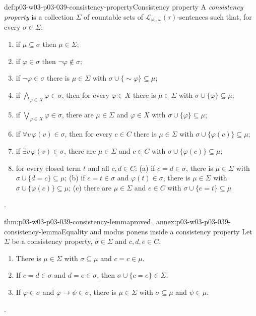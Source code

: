 \begin{hbdefinition}{def:p03-w03-p03-039-consistency-property}{Consistency property}
A \emph{consistency property} is a collection \(\Sigma\) of countable sets of
\(\mathcal L_{\omega_1,\omega}(\tau)\)-sentences such that, for every
\(\sigma\in\Sigma\):
\begin{enumerate}
\item[C0] if \(\mu\subseteq\sigma\) then \(\mu\in\Sigma\);
\item[C1] if \(\varphi\in\sigma\) then \(\neg\varphi\notin\sigma\);
\item[C2] if \(\neg\varphi\in\sigma\) there is \(\mu\in\Sigma\) with
      \(\sigma\cup\{{\sim}\varphi\}\subseteq\mu\);
\item[C3] if \(\bigwedge_{\varphi\in X}\varphi\in\sigma\), then for every
      \(\varphi\in X\) there is \(\mu\in\Sigma\) with
      \(\sigma\cup\{\varphi\}\subseteq\mu\);
\item[C4] if \(\bigvee_{\varphi\in X}\varphi\in\sigma\), there are
      \(\mu\in\Sigma\) and \(\varphi\in X\) with \(\sigma\cup\{\varphi\}\subseteq\mu\);
\item[C5] if \(\forall v\,\varphi(v)\in\sigma\), then for every \(c\in C\)
      there is \(\mu\in\Sigma\) with \(\sigma\cup\{\varphi(c)\}\subseteq\mu\);
\item[C6] if \(\exists v\,\varphi(v)\in\sigma\), there are \(\mu\in\Sigma\)
      and \(c\in C\) with \(\sigma\cup\{\varphi(c)\}\subseteq\mu\);
\item[C7] for every closed term \(t\) and all \(c,d\in C\):
      (a) if \(c=d\in\sigma\), there is \(\mu\in\Sigma\) with
      \(\sigma\cup\{d=c\}\subseteq\mu\);
      (b) if \(c=t\in\sigma\) and \(\varphi(t)\in\sigma\), there is
      \(\mu\in\Sigma\) with \(\sigma\cup\{\varphi(c)\}\subseteq\mu\);
      (c) there are \(\mu\in\Sigma\) and \(e\in C\) with
      \(\sigma\cup\{e=t\}\subseteq\mu\)
\end{enumerate}
\cite[Def.~4.1, p.~39]{Marker2014InfinitaryNotes}.
\end{hbdefinition}

\begin{hblemma}{thm:p03-w03-p03-039-consistency-lemma}{proved=annex:p03-w03-p03-039-consistency-lemma}{Equality and modus ponens inside a consistency property}
Let \(\Sigma\) be a consistency property, \(\sigma\in\Sigma\) and
\(c,d,e\in C\).
\begin{enumerate}
\item There is \(\mu\in\Sigma\) with \(\sigma\subseteq\mu\) and \(c=c\in\mu\).
\item If \(c=d\in\sigma\) and \(d=e\in\sigma\), then \(\sigma\cup\{c=e\}\in\Sigma\).
\item If \(\varphi\in\sigma\) and \(\varphi\to\psi\in\sigma\), there is
      \(\mu\in\Sigma\) with \(\sigma\subseteq\mu\) and \(\psi\in\mu\).
\end{enumerate}
\cite[Lemma~4.2 and Ex.~4.3, pp.~39--40]{Marker2014InfinitaryNotes}.
\end{hblemma}

